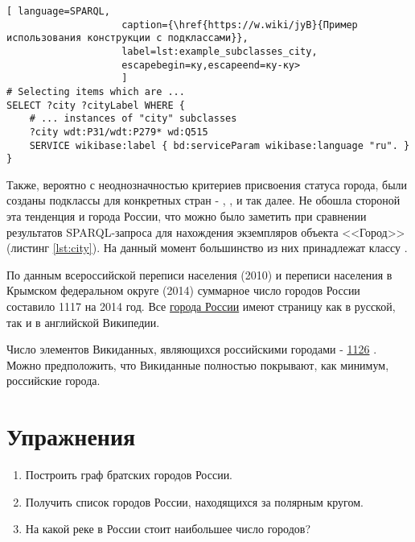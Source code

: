 \begin{lstlisting}[ language=SPARQL, 
                    caption={\href{https://w.wiki/jyB}{Пример использования конструкции с подклассами}},
                    label=lst:example_subclasses_city, 
                    escapebegin=ку,escapeend=ку-ку>
                    ]
# Selecting items which are ...
SELECT ?city ?cityLabel WHERE {
	# ... instances of "city" subclasses 
	?city wdt:P31/wdt:P279* wd:Q515
	SERVICE wikibase:label { bd:serviceParam wikibase:language "ru". }
}
\end{lstlisting}

Также, вероятно с неоднозначностью критериев присвоения статуса города, были созданы подклассы для конкретных стран - , ,  и так далее. Не обошла стороной эта тенденция и города России, что можно было заметить при сравнении результатов SPARQL-запроса для нахождения экземпляров объекта <<Город>> (листинг \ref{lst:city}). На данный момент большинство из них принадлежат классу .

По данным всероссийской переписи населения (2010) и переписи населения в Крымском федеральном округе (2014) суммарное число городов России составило \num{1117} на 2014 год. Все \href{https://ru.m.wikipedia.org/wiki/Список_городов_России}{города России} имеют страницу как в русской, так и в английской Википедии.

Число элементов Викиданных, являющихся российскими городами - \href{https://w.wiki/jyP}{1126} . Можно предположить, что Викиданные полностью покрывают, как минимум, российские города. 

\section{Упражнения}
\begin{enumerate}
\item Построить граф братских городов России.
\item Получить список городов России, находящихся за полярным кругом.
\item На какой реке в России стоит наибольшее число городов?
\end{enumerate}